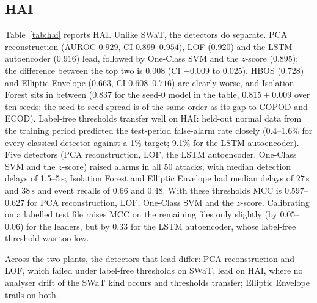 \documentclass[11pt]{article}
\begin{document}
\subsection{HAI}
\label{sec:hai}
Table~\ref{tab:hai} reports HAI. Unlike SWaT, the detectors do separate. PCA
reconstruction (AUROC $0.929$, CI $0.899$--$0.954$), LOF ($0.920$) and the LSTM
autoencoder ($0.916$) lead, followed by One-Class SVM and the $z$-score ($0.895$);
the difference between the top two is $0.008$ (CI $-0.009$ to $0.025$). HBOS
($0.728$) and Elliptic Envelope ($0.663$, CI $0.608$--$0.716$) are clearly worse,
and Isolation Forest sits in between ($0.837$ for the seed-0 model in the table,
$0.815\pm0.009$ over ten seeds; the seed-to-seed spread is of the same order as its gap
to COPOD and ECOD).
Label-free thresholds transfer well on HAI: held-out normal data from the training
period predicted the test-period false-alarm rate closely (0.4--1.6\% for every
classical detector against a 1\% target; 9.1\% for the LSTM autoencoder). Five
detectors (PCA reconstruction, LOF, the LSTM autoencoder, One-Class SVM and the $z$-score)
raised alarms in all 50 attacks, with median detection delays of 1.5--5\,s; Isolation
Forest and Elliptic Envelope had median delays of $27$\,s and $38$\,s and event recalls of
$0.66$ and $0.48$. With these thresholds MCC is
$0.597$--$0.627$ for PCA reconstruction, LOF, One-Class SVM and the $z$-score.
Calibrating on a labelled test file raises MCC on the remaining files only slightly
(by $0.05$--$0.06$) for the leaders, but by $0.33$ for the LSTM autoencoder, whose
label-free threshold was too low.

Across the two plants, the detectors that lead differ: PCA reconstruction and LOF,
which failed under label-free thresholds on SWaT, lead on HAI, where no analyser drift of
the SWaT kind occurs and thresholds transfer; Elliptic Envelope trails on both.
\end{document}
